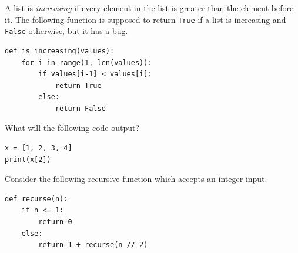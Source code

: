\documentclass[12pt]{exam}
\begin{document}
\begin{questions}

\question[12] A list is \emph{increasing} if every element in the list is greater than the element before it. The following function is supposed to return \lstinline{True} if a list is increasing and \lstinline{False} otherwise, but it has a bug.

\begin{lstlisting}
def is_increasing(values):
    for i in range(1, len(values)):
        if values[i-1] < values[i]:
            return True
        else:
            return False
\end{lstlisting}


\question[4] What will the following code output?

\begin{lstlisting}
x = [1, 2, 3, 4]
print(x[2])
\end{lstlisting}
\vfill

\newpage
\question[8] Consider the following recursive function which accepts an integer input. 

\begin{lstlisting}
def recurse(n):
    if n <= 1:
        return 0
    else:
        return 1 + recurse(n // 2) 
\end{lstlisting}


\end{questions}
\end{document}
